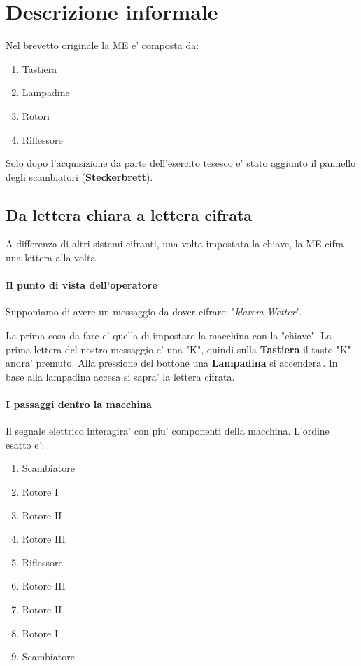 \section{Descrizione informale}

Nel brevetto originale la ME e' composta da:

\begin{enumerate}
\item Tastiera
\item Lampadine
\item Rotori
\item Riflessore
\end{enumerate}

Solo dopo l'acquisizione da parte dell'esercito tesesco e' stato
aggiunto il pannello degli scambiatori (\textbf{Steckerbrett}).

\subsection{Da lettera chiara a lettera cifrata}
A differenza di altri sistemi cifranti, una volta impostata la chiave, 
la ME cifra una lettera alla volta.

\paragraph{Il punto di vista dell'operatore}
Supponiamo di avere un messaggio da dover cifrare: 
"\textit{klarem Wetter}".

La prima cosa da fare e' quella di impostare la macchina con la "chiave".
La prima lettera del nostro messaggio e' una "K", quindi
sulla \textbf{Tastiera} il tasto "K" andra' premuto.
Alla pressione del bottone una \textbf{Lampadina} si accendera'.
In base alla lampadina accesa si sapra' la lettera cifrata.

\paragraph{I passaggi dentro la macchina}
Il segnale elettrico interagira' con piu' componenti della macchina.
L'ordine esatto e':

\begin{enumerate}
\item Scambiatore
\item Rotore I
\item Rotore II
\item Rotore III
\item Riflessore
\item Rotore III
\item Rotore II
\item Rotore I
\item Scambiatore
\end{enumerate}


